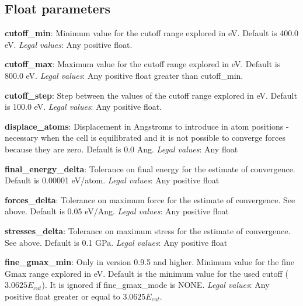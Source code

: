 \documentclass[10pt]{article}
\begin{document}
\subsection{Float parameters}

\textbf{cutoff\_min}: Minimum value for the cutoff range explored in eV. Default 
is 400.0 eV.\newline
\textit{Legal values}: Any positive float.\newline

\textbf{cutoff\_max}: Maximum value for the cutoff range explored in eV. Default 
is 800.0 eV.\newline
\textit{Legal values}: Any positive float greater than cutoff\_min.\newline

\textbf{cutoff\_step}: Step between the values of the cutoff range explored in 
eV. Default is 100.0 eV.\newline
\textit{Legal values}: Any positive float.\newline

\textbf{displace\_atoms}: Displacement in Angstroms to introduce in atom 
positions - necessary when the cell is equilibrated and it is not possible to 
converge forces because they are zero. Default is 0.0 Ang.\newline
\textit{Legal values}: Any float\newline

\textbf{final\_energy\_delta}: Tolerance on final energy for the estimate of 
convergence. Default is 0.00001 eV/atom.\newline
\textit{Legal values}: Any positive float\newline

\textbf{forces\_delta}: Tolerance on maximum force for the estimate of 
convergence. See above. Default is 0.05 eV/Ang.\newline
\textit{Legal values}: Any positive float\newline

\textbf{stresses\_delta}: Tolerance on maximum stress for the estimate of 
convergence. See above. Default is 0.1 GPa.\newline
\textit{Legal values}: Any positive float\newline

\textbf{fine\_gmax\_min}: Only in version 0.9.5 and higher. Minimum value for the fine Gmax range explored in eV. Default 
is the minimum value for the used cutoff ($3.0625E_{cut}$). It is ignored if fine\_gmax\_mode is NONE.\newline
\textit{Legal values}: Any positive float greater or equal to $3.0625E_{cut}$.\newline
\end{document}
